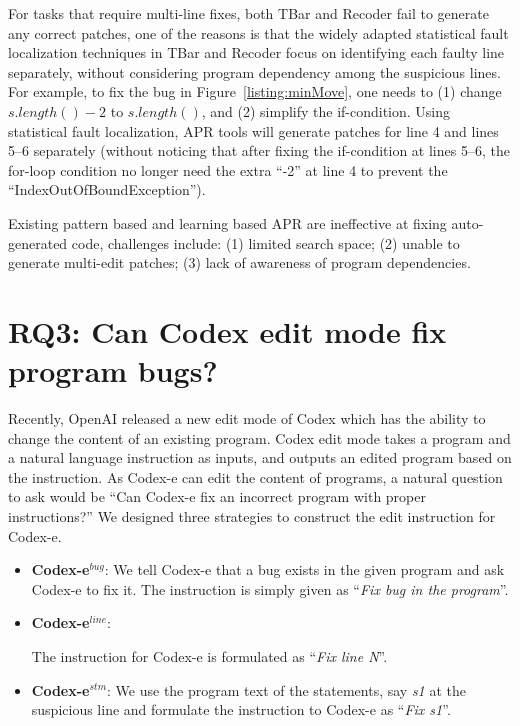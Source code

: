 For tasks that require multi-line fixes, both TBar and Recoder fail to generate any correct patches, one of the reasons is that the widely adapted statistical fault localization techniques in TBar and Recoder focus on identifying each faulty line separately, without considering program dependency among the suspicious lines. For example, to fix the bug in Figure~\ref{listing:minMove}, one needs to (1) change $s.length()-2$ to $s.length()$, and (2) simplify the if-condition. Using statistical fault localization, APR tools will generate patches for line 4 and lines 5--6 separately (without noticing that after fixing the if-condition at lines 5--6, the for-loop condition no longer need the extra ``-2'' at line 4 to prevent the ``IndexOutOfBoundException'').

\begin{tcolorbox}[left=2pt,right=2pt,top=2pt,bottom=2pt]

Existing pattern based and learning based APR are ineffective at fixing auto-generated code, challenges include: (1) limited search space; (2) unable to generate multi-edit patches; (3) lack of awareness of program dependencies.

\end{tcolorbox}

\section{RQ3: Can Codex edit mode fix program bugs?}
\label{sec:rq3}

Recently, OpenAI released a new edit mode of Codex which has the ability to change the content of an existing program. Codex edit mode takes a program and a natural language instruction as inputs, and outputs an edited program based on the instruction. As Codex-e can edit the content of programs, a natural question to ask would be ``Can Codex-e fix an incorrect program with proper instructions?'' We designed three strategies to construct the edit instruction for Codex-e.

\begin{itemize}[leftmargin=*]
    \item \textbf{Codex-e$^{bug}$}: We tell Codex-e that a bug exists in the given program and ask Codex-e to fix it. The instruction is simply given as ``\emph{Fix bug in the program}''.
    \item \textbf{Codex-e$^{line}$}: 

    The instruction for Codex-e is formulated as ``\emph{Fix line N}''.
    \item \textbf{Codex-e$^{stm}$}: 
    We use the program text of the statements, say {\em s1} at the suspicious line and formulate the instruction to Codex-e as ``\emph{Fix s1}''. 
\end{itemize}

